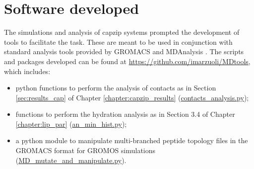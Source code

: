 \clearpage
\section{Software developed}
\label{sec:Appendix_software}

The simulations and analysis of capzip systems prompted the development of tools to facilitate the task.
%
These are meant to be used in conjunction with standard analysis tools provided by GROMACS \citep{Berendsen1995,Abraham2015,gromacs_man} and MDAnalysis \citep{Michaud-Agrawal2011,Gowers2016}.
%
The scripts and packages developed can be found at \url{https://github.com/imarzuoli/MDtools}, which includes:
\begin{itemize}
\item python functions to perform the analysis of contacts as in Section \ref{sec:results_cap} of Chapter \ref{chapter:capzip_results} (\url{contacts_analysis.py});

\item functions to perform the hydration analysis as in Section 3.4 of Chapter \ref{chapter:lip_par} (\url{an_min_hist.py});

\item a python module to manipulate multi-branched peptide topology files in the GROMACS format for GROMOS simulations (\url{MD_mutate_and_manipulate.py}).

\end{itemize}
